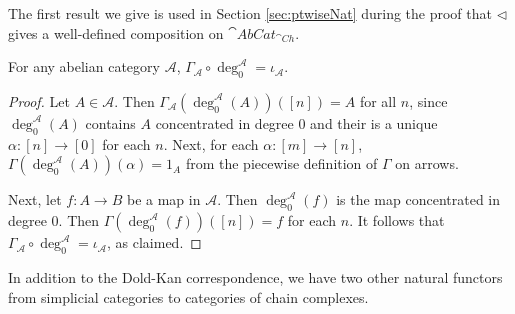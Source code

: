 The first result we give is used in Section \ref{sec:ptwiseNat} during the proof that $\lhd$ gives a well-defined composition on $\cat{AbCat}_{\cat{Ch}}$.

\begin{lem}[label=lem:gammaDeg]
    For any abelian category $\mathcal{A}$, $\Gamma_\mathcal{A}\circ \deg_0^\mathcal{A} = \iota_\mathcal{A}$.
\end{lem}
\begin{proof}
    Let $A \in \mathcal{A}$. Then $\Gamma_\mathcal{A}(\deg_0^\mathcal{A}(A))([n]) = A$ for all $n$, since $\deg_0^\mathcal{A}(A)$ contains $A$ concentrated in degree $0$ and their is a unique $\alpha:[n]\rightarrow [0]$ for each $n$. Next, for each $\alpha:[m]\rightarrow [n]$, $\Gamma(\deg_0^\mathcal{A}(A))(\alpha) = 1_A$ from the piecewise definition of $\Gamma$ on arrows.

    Next, let $f:A\rightarrow B$ be a map in $\mathcal{A}$. Then $\deg_0^\mathcal{A}(f)$ is the map concentrated in degree $0$. Then $\Gamma(\deg_0^\mathcal{A}(f))([n]) = f$ for each $n$. It follows that $\Gamma_\mathcal{A}\circ \deg_0^\mathcal{A} = \iota_\mathcal{A}$, as claimed.
\end{proof}



In addition to the Dold-Kan correspondence, we have two other natural functors from simplicial categories to categories of chain complexes.


